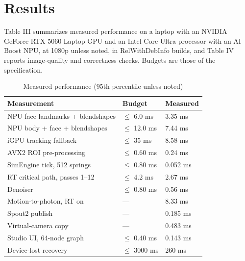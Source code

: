 \documentclass[conference]{IEEEtran}
\begin{document}
\section{Results}
Table III summarizes measured performance on a laptop with an NVIDIA GeForce RTX 5060 Laptop GPU and an Intel Core Ultra processor with an AI Boost NPU, at 1080p unless noted, in RelWithDebInfo builds, and Table IV reports image-quality and correctness checks. Budgets are those of the specification.

\begin{table}[!t]
\renewcommand{\arraystretch}{1.15}
\caption{Measured performance (95th percentile unless noted)}
\label{tab:perf}
\centering\footnotesize
\begin{tabular}{p{}p{}p{}}
\hline
\textbf{Measurement} & \textbf{Budget} & \textbf{Measured} \\
\hline
NPU face landmarks + blendshapes & $\le$ 6.0 ms & 3.35 ms \\
NPU body + face + blendshapes & $\le$ 12.0 ms & 7.44 ms \\
iGPU tracking fallback & $\le$ 35 ms & 8.58 ms \\
AVX2 ROI pre-processing & $\le$ 0.60 ms & 0.24 ms \\
SimEngine tick, 512 springs & $\le$ 0.80 ms & 0.052 ms \\
RT critical path, passes 1--12 & $\le$ 4.2 ms & 2.67 ms \\
Denoiser & $\le$ 0.80 ms & 0.56 ms \\
Motion-to-photon, RT on & --- & 8.33 ms \\
Spout2 publish & --- & 0.185 ms \\
Virtual-camera copy & --- & 0.483 ms \\
Studio UI, 64-node graph & $\le$ 0.40 ms & 0.143 ms \\
Device-lost recovery & $\le$ 3000 ms & 260 ms \\
\hline
\end{tabular}
\end{table}
\end{document}
